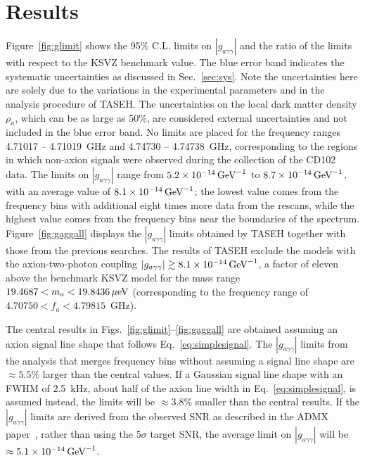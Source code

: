 \documentclass[%
reprint, %
superscriptaddress,
 amsmath,amssymb,
 aps
]{revtex4-2}
\begin{document}
 
\section{Results} \label{sec:results}

Figure~\ref{fig:glimit} shows the 95\% C.L. limits on 
$\left|g_{a\gamma\gamma}\right|$ and the ratio of the limits  
with respect to the KSVZ benchmark value.  
The blue error band indicates the systematic uncertainties as discussed in 
Sec.~\ref{sec:sys}. Note the uncertainties here are solely due to the 
variations in the experimental parameters and in the analysis procedure 
of TASEH. The uncertainties on the local dark matter density $\rho_a$,
 which can be as large as 50\%, are considered external uncertainties 
and not included in the blue error band.  
No limits are placed for the frequency ranges  
4.71017 -- 4.71019~GHz and 4.74730 -- 4.74738~GHz, corresponding to 
the regions in which non-axion signals were observed 
during the collection of the CD102 data. The limits on 
$\left|g_{a\gamma\gamma}\right|$ range from 
$5.2\times 10^{-14}\,\text{Ge\hspace{-.08em}V}^{-1}$ to 
$8.7\times 10^{-14}\,\text{Ge\hspace{-.08em}V}^{-1}$, 
with an average 
value of $8.1\times 10^{-14}\,\text{Ge\hspace{-.08em}V}^{-1}$; the lowest 
value comes from the frequency bins with 
additional eight times more data from the rescans, while the highest value 
comes from the frequency bins near the boundaries of the spectrum. 
Figure~\ref{fig:gaggall} displays the $\left|g_{a\gamma\gamma}\right|$ limits 
obtained by TASEH together with those from the previous searches. 
The results of TASEH exclude the models with the axion-two-photon coupling 
$\left|g_{a\gamma\gamma}\right|\gtrsim 8.1\times 10^{-14}\,\text{Ge\hspace{-.08em}V}^{-1}$, 
a factor of eleven above the benchmark
KSVZ model for the mass range 
$19.4687 < m_a < 19.8436 \,\mu\text{e\hspace{-.08em}V}$ (corresponding to 
the frequency range of $4.70750 < f_a < 4.79815$~GHz). 


The central results in Figs.~\ref{fig:glimit}--\ref{fig:gaggall} are 
obtained assuming an axion signal line shape that follows 
Eq.~\eqref{eq:simplesignal}. The $\left|g_{a\gamma\gamma}\right|$ limits from 
the analysis that merges frequency bins without assuming a signal line shape 
are $\approx5.5$\% larger than the central values. 
If a Gaussian signal line shape with an FWHM of 2.5~kHz,  
about half of the axion line width in Eq.~\eqref{eq:simplesignal}, is 
assumed instead, the limits will be $\approx3.8$\% smaller than the central 
results. If the $\left|g_{a\gamma\gamma}\right|$ limits are derived from the 
observed SNR as described in the ADMX paper~\cite{ADMXVIII}, 
rather than using the 5$\sigma$ target SNR, the average limit on 
$\left|g_{a\gamma\gamma}\right|$ will 
be $\approx 5.1\times 10^{-14}\,\text{Ge\hspace{-.08em}V}^{-1}$. 
\end{document}
